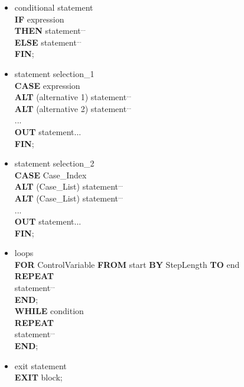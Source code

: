 \begin{itemize}
\item conditional statement\\

      {\bf IF} expression\\
      {\bf THEN} statement$^{...}$\\
      {\bf ELSE} statement$^{...}$\\
      {\bf FIN};

\item statement selection\_1\\

      {\bf CASE} expression\\
      {\bf ALT} (alternative 1) statement$^{...}$\\
      {\bf ALT} (alternative 2) statement$^{...}$\\
      ...\\
      {\bf OUT} statement${...}$\\
      {\bf FIN};

\item statement selection\_2\\

      {\bf CASE} Case\_Index\\
      {\bf ALT} (Case\_List) statement$^{...}$\\
      {\bf ALT} (Case\_List) statement$^{...}$\\
      ...\\
      {\bf OUT} statement${...}$\\
      {\bf FIN};

\item loops\\

      {\bf FOR} ControlVariable {\bf FROM} start {\bf BY} StepLength {\bf TO} end\\
      {\bf REPEAT}\\
      statement$^{...}$\\
      {\bf END};\\

      {\bf WHILE} condition\\
      {\bf REPEAT}\\
      statement$^{...}$\\
      {\bf END};

\item exit statement\\

      {\bf EXIT} block;
\end{itemize}

